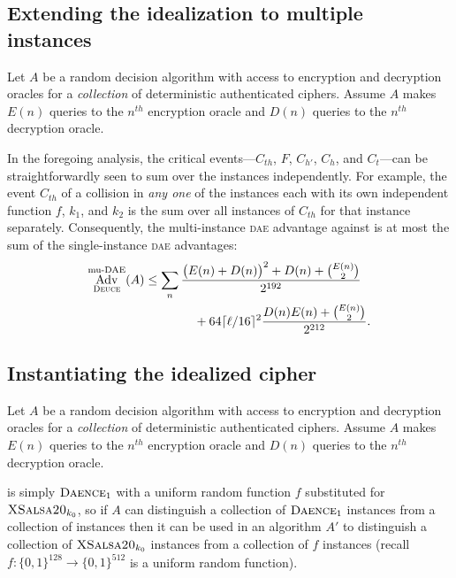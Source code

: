 \documentclass{article}
\def\operatorsc#1{{%
  \ifmmode\let\next=\operatorname\else\let\next=\relax\fi\next{\textsc{#1}}}}
\def\XSalsa#1/{\operatorsc{XSalsa#1}}
\def\DAENCE/{\operatorsc{Daence}}
\def\DEUCE/{\operatorsc{Deuce}}
\def\DAE{%
  \ifmmode\def\next{\operatorname{DAE}}%
    \else\def\next/{\textsc{dae}}%
  \fi\next}
\def\muDAE{%
  \ifmmode\def\next{\operatorname{mu-DAE}}%
    \else\def\next/{mu-\textsc{dae}}%
  \fi\next}
\DeclareMathOperator{\Adv}{Adv}
\begin{document}
\subsection{Extending the idealization to multiple instances}

Let $A$ be a random decision algorithm with access to encryption and
 decryption oracles for a \emph{collection} of deterministic
 authenticated ciphers.
Assume $A$ makes $E(n)$ queries to the $n^{\mathit{th}}$ encryption
 oracle and $D(n)$ queries to the $n^{\mathit{th}}$ decryption oracle.

In the foregoing analysis, the critical events---$C_{th}$, $F$,
 $C_{h'}$, $C_h$, and $C_t$---can be straightforwardly seen to sum
 over the instances independently.
For example, the event $C_{th}$ of a collision in \emph{any one} of
 the instances each with its own independent function $f$, $k_1$, and
 $k_2$ is the sum over all instances of $C_{th}$ for that instance
 separately.
Consequently, the multi-instance \DAE/ advantage against \DEUCE/ is at
 most the sum of the single-instance \DAE/ advantages:
%
\begin{align*}
  \Adv^{\muDAE}_{\DEUCE/}(A)
  &\leq \sum_n \frac{\bigl(E(n) + D(n)\bigr)^2 + D(n) + \binom{E(n)}{2}}
                    {2^{192}} \\
  &\qquad\qquad
          + 64\lceil\ell/16\rceil^2
            \frac{D(n) E(n) + \binom{E(n)}{2}}{2^{212}}.
\end{align*}

\subsection{Instantiating the idealized cipher}

Let $A$ be a random decision algorithm with access to encryption and
 decryption oracles for a \emph{collection} of deterministic
 authenticated ciphers.
Assume $A$ makes $E(n)$ queries to the $n^{\mathit{th}}$ encryption
 oracle and $D(n)$ queries to the $n^{\mathit{th}}$ decryption oracle.

\DEUCE/ is simply $\DAENCE/_1$ with a uniform random function $f$
 substituted for $\XSalsa20/_{k_0}$, so if $A$ can distinguish a
 collection of $\DAENCE/_1$ instances from a collection of \DEUCE/
 instances then it can be used in an algorithm $A'$ to distinguish
 a collection of $\XSalsa20/_{k_0}$ instances from a collection of $f$
 instances (recall $f\colon \{0,1\}^{128} \to \{0,1\}^{512}$ is a
 uniform random function).
\end{document}
